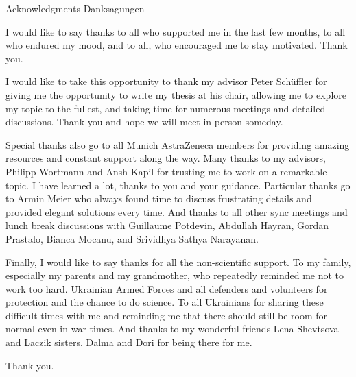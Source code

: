 \makeatletter
{}
{}
{}
\makeatother
\thispagestyle{empty}

\vspace*{20mm}

\begin{center}
\makeatletter
{}
{ Acknowledgments}
{ Danksagungen}
\makeatother
\end{center}

\vspace{10mm}

I would like to say thanks to all who supported me in the last few months, to all who endured my mood, and to all, who encouraged me to stay motivated. Thank you.

I would like to take this opportunity to thank my advisor Peter Schüffler for giving me the opportunity to write my thesis at his chair, allowing me to explore my topic to the fullest, and taking time for numerous meetings and detailed discussions. Thank you and hope we will meet in person someday.

Special thanks also go to all Munich AstraZeneca members for providing amazing resources and constant support along the way. Many thanks to my advisors, Philipp Wortmann and Ansh Kapil for trusting me to work on a remarkable topic. I have learned a lot, thanks to you and your guidance. Particular thanks go to Armin Meier who always found time to discuss frustrating details and provided elegant solutions every time. And thanks to all other sync meetings and lunch break discussions with Guillaume Potdevin, Abdullah Hayran, Gordan Prastalo, Bianca Mocanu, and Srividhya Sathya Narayanan. 

Finally, I would like to say thanks for all the non-scientific support. To my family, especially my parents and my grandmother, who repeatedly reminded me not to work too hard.
Ukrainian Armed Forces and all defenders and volunteers for protection and the chance to do science. To all Ukrainians for sharing these difficult times with me and reminding me that there should still be room for normal even in war times.  And thanks to my wonderful friends Lena Shevtsova and Laczik sisters, Dalma and Dori for being there for me.

Thank you.

\cleardoublepage{}
